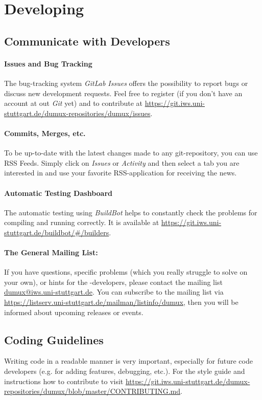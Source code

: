 \section{Developing \Dumux}
\label{sc_developingdumux}

\subsection{Communicate with \Dumux Developers}

\paragraph{Issues and Bug Tracking}
The bug-tracking system \emph{GitLab Issues} offers the possibility to report bugs or discuss new development requests.
Feel free to register (if you don't have an account at out \emph{Git} yet) and to contribute
at \url{https://git.iws.uni-stuttgart.de/dumux-repositories/dumux/issues}.

\paragraph{Commits, Merges, etc.}
To be up-to-date with the latest changes made to any git-repository, you can use RSS Feeds.
Simply click on \emph{Issues} or \emph{Activity} and then select a tab you are interested in
and use your favorite RSS-application for receiving the news.

\paragraph{Automatic Testing Dashboard}
The automatic testing using \emph{BuildBot} helps to constantly check the
\Dumux problems for compiling and running correctly. It is available at
\url{https://git.iws.uni-stuttgart.de/buildbot/#/builders}.

\paragraph{The General Mailing List:}
If you have questions, specific problems (which you really struggle to solve on your own),
or hints for the \Dumux-developers, please contact the mailing list \url{dumux@iws.uni-stuttgart.de}.
You can subscribe to the mailing list via
\url{https://listserv.uni-stuttgart.de/mailman/listinfo/dumux}, then you
will be informed about upcoming releases or events.

\subsection{Coding Guidelines}
Writing code in a readable manner is very important, especially
for future code developers (e.g. for adding features, debugging, etc.).
For the style guide and instructions how to contribute to \Dumux visit
\url{https://git.iws.uni-stuttgart.de/dumux-repositories/dumux/blob/master/CONTRIBUTING.md}.


